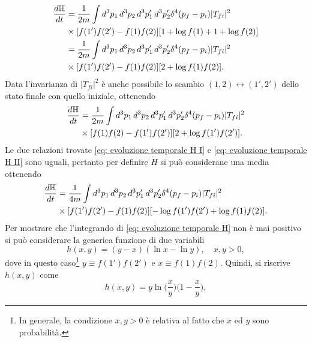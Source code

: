 \begin{equation}
\label{eq: evoluzione temporale H I}
    \begin{split}
        \frac{d\mathbb{H}}{dt} &= \frac{1}{2m}\int d^3p_1\,d^3p_2\,d^3p_1'\,d^3p_2'\delta^4(p_f - p_i)|T_{fi}|^2 \\
        &\times[f(1')f(2') - f(1)f(2)][1 + \log{f(1)} + 1 + \log{f(2)}] \\ 
        &= \frac{1}{2m}\int d^3p_1\,d^3p_2\,d^3p_1'\,d^3p_2'\delta^4(p_f - p_i)|T_{fi}|^2 \\
        &\times[f(1')f(2') - f(1)f(2)][2 + \log{f(1)f(2)}].
    \end{split}
\end{equation}
Data l'invarianza di $|T_{fi}|^2$ è anche possibile lo scambio $(1,2) \leftrightarrow (1',2')$ dello stato finale con quello iniziale, ottenendo
\begin{equation}
\label{eq: evoluzione temporale H II}
        \begin{split}
            \frac{d\mathbb{H}}{dt} &= \frac{1}{2m}\int d^3p_1\,d^3p_2\,d^3p_1'\,d^3p_2'\delta^4(p_f - p_i)|T_{fi}|^2 \\
            &\times[f(1)f(2) - f(1')f(2')][2 + \log{f(1')f(2')}].
        \end{split}
\end{equation}
Le due relazioni trovate \eqref{eq: evoluzione temporale H I} e \eqref{eq: evoluzione temporale H II} sono uguali, pertanto per definire $\dot{H}$ si può considerane una media ottenendo
\begin{equation}
\label{eq: evoluzione temporale H}
    \begin{split}
        \frac{d\mathbb{H}}{dt} &= \frac{1}{4m}\int d^3p_1\,d^3p_2\,d^3p_1'\,d^3p_2'\delta^4(p_f - p_i)|T_{fi}|^2 \\
        &\times[f(1')f(2') - f(1)f(2)][-\log{f(1')f(2')} + \log{f(1)f(2)}].
    \end{split}
\end{equation}
Per mostrare che l'integrando di \eqref{eq: evoluzione temporale H} non è mai positivo si può considerare la generica funzione di due variabili
\begin{equation}
    h(x,y) = (y - x)(\ln{x} - \ln{y}),\quad x,y > 0,
\end{equation}
dove in questo caso\footnote{In generale, la condizione $x,y > 0$ è relativa al fatto che $x$ ed $y$ sono probabilità.} $y \equiv f(1')f(2')$ e $x \equiv f(1)f(2)$. Quindi, si riscrive $h(x,y)$ come
\begin{equation}
    h(x,y) = y\ln{\bigg(\frac{x}{y}\bigg)}\bigg(1 - \frac{x}{y}\bigg),
\end{equation}
